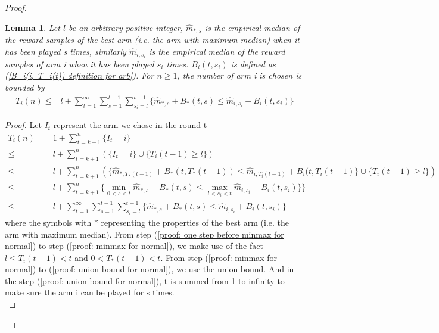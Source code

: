 \documentclass{article}
\theoremstyle{plain}
\newtheorem{lemma}{Lemma}
\begin{document}
\begin{proof}
\begin{lemma}
\label{Lemma 2 normal}
Let $l$ be an arbitrary positive integer, $\hat{m}_{*, s}$ is the empirical median of the reward samples of the best arm (i.e. the arm with maximum median) when it has been played s times, similarly $\hat{m}_{i, s_i}$ is the empirical median of the reward samples of arm i when it has been played $s_i$ times. $B_i(t, s_i)$ is defined as (\ref{B_i(i, T_i(t)) definition for arb}). For $n \geq 1$, the number of arm i is chosen is bounded by
\begin{align}
    T_i(n) \leq & l + \sum_{t = 1}^\infty \sum_{s = 1}^{t-1} \sum_{s_i = l}^{t-1} \{\hat{m}_{*, s} + B_*(t, s)  \leq \hat{m}_{i, s_i} + B_i(t, s_i)\}
\end{align}
\end{lemma}
 
\begin{proof}
Let $I_t$ represent the arm we chose in the round t
    \begin{align}
        T_i(n) =& 1 + \sum_{t = k + 1}^n \{I_t = i\}\\
       \leq & l + \sum_{t = k + 1}^n (\{I_t = i\} \cup \{T_i(t-1) \geq l\})\\
       \label{proof: one step before minmax for normal}
       \leq & l + \sum_{t = k + 1}^n \left(\{ \hat{m}_{*, T_*(t-1)} + B_*(t, T_*(t-1)) \leq \hat{m}_{i, T_i(t-1)} + B_i(t, T_i(t-1)\} \cup \{ T_i(t-1) \geq l\}\right)\\
       \label{proof: minmax for normal}
       \leq & l + \sum_{t = k + 1}^n \{ \mathop{min}\limits_{0 < s < t}\hat{m}_{*, s} + B_*(t, s) \leq \mathop{max}\limits_{l < s_i < t}\hat{m}_{i, s_i} + B_i(t, s_i)\}\}\\
       \label{proof: union bound for normal}
       \leq & l + \sum_{t = 1}^\infty \sum_{s = 1}^{t-1} \sum_{s_i = l}^{t-1} \{\hat{m}_{*, s} + B_*(t, s)  \leq \hat{m}_{i, s_i} + B_i(t, s_i)\}
    \end{align}
    where the symbols with $*$ representing the properties of the best arm (i.e. the arm with maximum median). From step (\ref{proof: one step before minmax for normal}) to step (\ref{proof: minmax for normal}), we make use of the fact $l \leq T_i(t-1) < t$ and $0 < T_*(t-1) < t$. From step (\ref{proof: minmax for normal}) to (\ref{proof: union bound for normal}), we use the union bound. And in the step (\ref{proof: union bound for normal}), t is summed from 1 to infinity to make sure the arm i can be played for s times.\\
\end{proof}


\end{proof}
\end{document}
